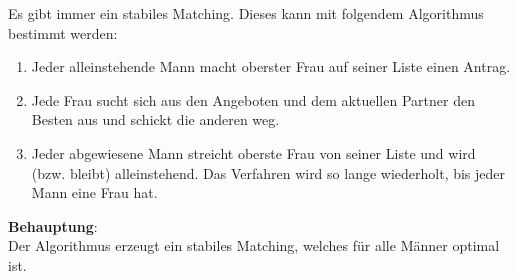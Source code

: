 Es gibt immer ein stabiles Matching.
Dieses kann mit folgendem Algorithmus bestimmt werden:
\begin{enumerate}
    \item
    Jeder alleinstehende Mann macht oberster Frau auf seiner Liste einen
    Antrag.

    \item Jede Frau sucht sich aus den Angeboten und dem aktuellen Partner
    den Besten aus und schickt die anderen weg.

    \item Jeder abgewiesene Mann streicht oberste Frau von seiner Liste
    und wird (bzw. bleibt) alleinstehend.
    Das Verfahren wird so lange wiederholt, bis jeder Mann eine Frau hat.
\end{enumerate}

\textbf{Behauptung}: \\
Der Algorithmus erzeugt ein stabiles Matching, welches für alle Männer
optimal ist.

